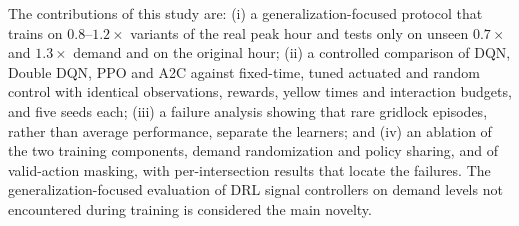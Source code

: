 The contributions of this study are: (i) a generalization-focused protocol that trains on $0.8$--$1.2\times$ variants of the real peak hour and tests only on unseen $0.7\times$ and $1.3\times$ demand and on the original hour; (ii) a controlled comparison of DQN, Double DQN, PPO and A2C against fixed-time, tuned actuated and random control with identical observations, rewards, yellow times and interaction budgets, and five seeds each; (iii) a failure analysis showing that rare gridlock episodes, rather than average performance, separate the learners; and (iv) an ablation of the two training components, demand randomization and policy sharing, and of valid-action masking, with per-intersection results that locate the failures. The generalization-focused evaluation of DRL signal controllers on demand levels not encountered during training is considered the main novelty.
